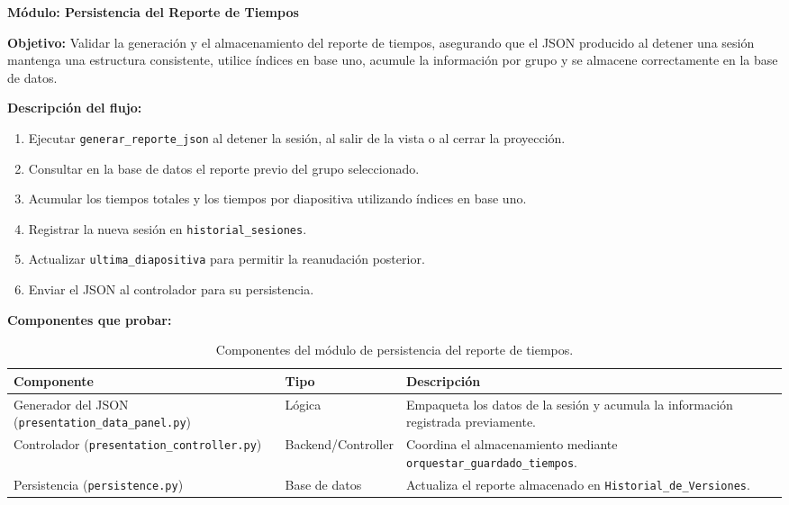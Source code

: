 \documentclass[11pt]{article}
\begin{document}
\clearpage
\textbf{Módulo: Persistencia del Reporte de Tiempos}

\textbf{Objetivo:} Validar la generación y el almacenamiento del reporte de tiempos, asegurando que el JSON producido al detener una sesión mantenga una estructura consistente, utilice índices en base uno, acumule la información por grupo y se almacene correctamente en la base de datos.

\textbf{Descripción del flujo:}
\begin{enumerate}
    \item Ejecutar \texttt{generar\_reporte\_json} al detener la sesión, al salir de la vista o al cerrar la proyección.
    \item Consultar en la base de datos el reporte previo del grupo seleccionado.
    \item Acumular los tiempos totales y los tiempos por diapositiva utilizando índices en base uno.
    \item Registrar la nueva sesión en \texttt{historial\_sesiones}.
    \item Actualizar \texttt{ultima\_diapositiva} para permitir la reanudación posterior.
    \item Enviar el JSON al controlador para su persistencia.
\end{enumerate}

\textbf{Componentes que probar:}

\begin{table}[H]
    \centering
    \begin{tabular}{|L{0.34\textwidth}|L{0.18\textwidth}|L{0.38\textwidth}|}
        \hline
        \textbf{Componente} & \textbf{Tipo} & \textbf{Descripción} \\ \hline
        Generador del JSON (\texttt{presentation\_data\_panel.py}) & Lógica & Empaqueta los datos de la sesión y acumula la información registrada previamente. \\ \hline
        Controlador (\texttt{presentation\_controller.py}) & Backend/Controller & Coordina el almacenamiento mediante \texttt{orquestar\_guardado\_tiempos}. \\ \hline
        Persistencia (\texttt{persistence.py}) & Base de datos & Actualiza el reporte almacenado en \texttt{Historial\_de\_Versiones}. \\ \hline
    \end{tabular}
    \caption{Componentes del módulo de persistencia del reporte de tiempos.}
    \label{tab:componentes-modulo-reporte}
\end{table}
\end{document}
